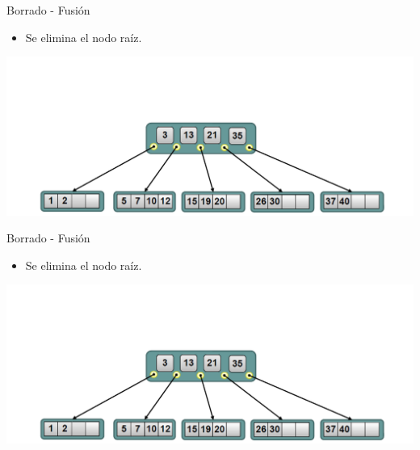 \documentclass[handout]{beamer} %
\newcommand{\redb}[1]{{\color{red!70!black}{#1}}}
\begin{document}
\begin{frame}{Borrado - Fusión}
    \begin{itemize}
        \item Se elimina el nodo raíz. \redb{Fin}
    \end{itemize}
    \begin{center}
        \includegraphics[width=\textwidth]{./image/cap3/b-tree-delete12}
    \end{center}
\end{frame}

\begin{frame}{Borrado - Fusión}
    \begin{itemize}
        \item Se elimina el nodo raíz. \redb{Fin}
    \end{itemize}
    \begin{center}
        \includegraphics[width=\textwidth]{./image/cap3/b-tree-delete12}
    \end{center}
\end{frame}
\end{document}
